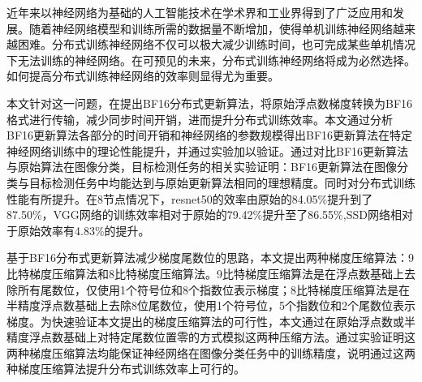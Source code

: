 \begin{cabstract}
近年来以神经网络为基础的人工智能技术在学术界和工业界得到了广泛应用和发展。随着神经网络模型和训练所需的数据量不断增加，使得单机训练神经网络越来越困难。分布式训练神经网络不仅可以极大减少训练时间，也可完成某些单机情况下无法训练的神经网络。在可预见的未来，分布式训练神经网络将成为必然选择。如何提高分布式训练神经网络的效率则显得尤为重要。

本文针对这一问题，在提出BF16分布式更新算法，将原始浮点数梯度转换为BF16格式进行传输，减少同步时间开销，进而提升分布式训练效率。本文通过分析BF16更新算法各部分的时间开销和神经网络的参数规模得出BF16更新算法在特定神经网络训练中的理论性能提升，并通过实验加以验证。通过对比BF16更新算法与原始算法在图像分类，目标检测任务的相关实验证明：BF16更新算法在图像分类与目标检测任务中均能达到与原始更新算法相同的理想精度。同时对分布式训练性能有所提升。在8节点情况下，resnet50的效率由原始的84.05\%提升到了87.50\%，VGG网络的训练效率相对于原始的79.42\%提升至了86.55\%,SSD网络相对于原始效率有4.83\%的提升。

基于BF16分布式更新算法减少梯度尾数位的思路，本文提出两种梯度压缩算法：9比特梯度压缩算法和8比特梯度压缩算法。9比特梯度压缩算法是在浮点数基础上去除所有尾数位，仅使用1个符号位和8个指数位表示梯度；8比特梯度压缩算法是在半精度浮点数基础上去除8位尾数位，使用1个符号位，5个指数位和2个尾数位表示梯度。为快速验证本文提出的梯度压缩算法的可行性，本文通过在原始浮点数或半精度浮点数基础上对特定尾数位置零的方式模拟这两种压缩方法。通过实验证明这两种梯度压缩算法均能保证神经网络在图像分类任务中的训练精度，说明通过这两种梯度压缩算法提升分布式训练效率上可行的。

\end{cabstract}

